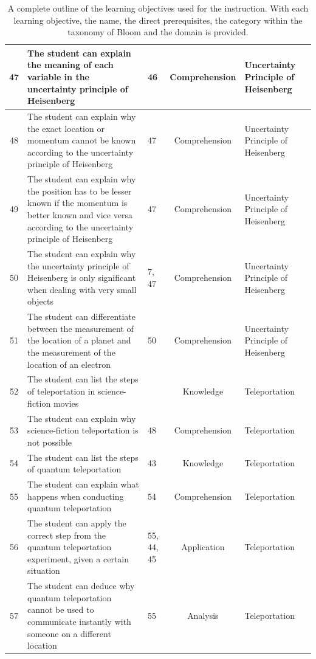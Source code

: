 \documentclass[11pt,twoside]{report} %
\begin{document}
\begin{table}[htbp]
\small
\begin{center}
\begin{tabular}{|c|p{5cm}|p{1.5cm}|c|p{3cm}|}
\hline
47 & The student can explain the meaning of each variable in the uncertainty principle of Heisenberg & 46 & Comprehension & Uncertainty Principle of Heisenberg \\ \hline
48 & The student can explain why the exact location or momentum cannot be known according to the uncertainty principle of Heisenberg & 47 & Comprehension & Uncertainty Principle of Heisenberg \\ \hline
49 & The student can explain why the position has to be lesser known if the momentum is better known and vice versa according to the uncertainty principle of Heisenberg & 47 & Comprehension & Uncertainty Principle of Heisenberg \\ \hline
50 & The student can explain why the uncertainty principle of Heisenberg is only significant when dealing with very small objects & 7, 47 & Comprehension & Uncertainty Principle of Heisenberg \\ \hline
51 & The student can differentiate between the measurement of the location of a planet and the measurement of the location of an electron & 50 & Comprehension & Uncertainty Principle of Heisenberg \\ \hline
52 & The student can list the steps of teleportation in science-fiction movies &  & Knowledge & Teleportation \\ \hline
53 & The student can explain why science-fiction teleportation is not possible & 48 & Comprehension & Teleportation \\ \hline
54 & The student can list the steps of quantum teleportation & 43 & Knowledge & Teleportation \\ \hline
55 & The student can explain what happens when conducting quantum teleportation & 54 & Comprehension & Teleportation \\ \hline
56 & The student can apply the correct step from the quantum teleportation experiment, given a certain situation & 55, 44, 45 & Application & Teleportation \\ \hline
57 & The student can deduce why quantum teleportation cannot be used to communicate instantly with someone on a different location & 55 & Analysis & Teleportation \\ \hline
\end{tabular}
\end{center}
\caption{A complete outline of the learning objectives used for the instruction. With each learning objective, the name, the direct prerequisites, the category within the taxonomy of Bloom and the domain is provided.}
\label{completeoutline}
\end{table}
\end{document}
